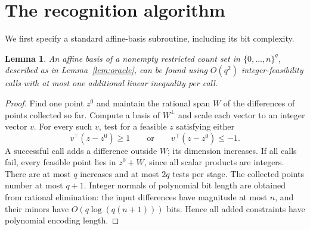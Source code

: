 \documentclass[11pt]{article}
\newtheorem{lemma}[theorem]{Lemma}
\begin{document}
\section{The recognition algorithm}
We first specify a standard affine-basis subroutine, including its bit complexity.
\begin{lemma}\label{lem:basis}
An affine basis of a nonempty restricted count set in $\{0,\ldots,n\}^q$, described as in Lemma~\ref{lem:oracle}, can be found using $O(q^2)$ integer-feasibility calls with at most one additional linear inequality per call.
\end{lemma}
\begin{proof}
Find one point $z^0$ and maintain the rational span $W$ of the differences of points collected so far. Compute a basis of $W^\perp$ and scale each vector to an integer vector $v$. For every such $v$, test for a feasible $z$ satisfying either
\[
 v^\top(z-z^0)\ge1\qquad\text{or}\qquad v^\top(z-z^0)\le-1.
\]
A successful call adds a difference outside $W$; its dimension increases. If all calls fail, every feasible point lies in $z^0+W$, since all scalar products are integers. There are at most $q$ increases and at most $2q$ tests per stage. The collected points number at most $q+1$. Integer normals of polynomial bit length are obtained from rational elimination: the input differences have magnitude at most $n$, and their minors have $O(q\log(q(n+1)))$ bits. Hence all added constraints have polynomial encoding length.
\end{proof}
\end{document}
